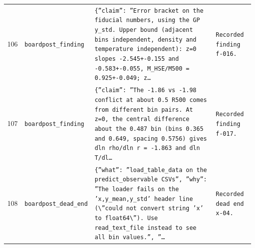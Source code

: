 \documentclass[11pt,a4paper]{article}
\begin{document}
\begin{longtable}{@{}p{}p{}p{}p{}@{}}
106 & \texttt{board}\newline\texttt{post\_\allowbreak{}finding} & \texttt{\{''claim'':\allowbreak{} ''Error bracket on the fiducial numbers,\allowbreak{} using the GP y\_\allowbreak{}std. Upper bound (adjacent bins independent,\allowbreak{} density and temperature independent)\allowbreak{}:\allowbreak{} z=\allowbreak{}0 slopes -2.545+-0.155 and -0.583+-0.055,\allowbreak{} M\_\allowbreak{}HSE/\allowbreak{}M500 =\allowbreak{} 0.925+-0.049;\allowbreak{} z\ldots{}\allowbreak{}} & \texttt{Recorded finding f-016.} \\
107 & \texttt{board}\newline\texttt{post\_\allowbreak{}finding} & \texttt{\{''claim'':\allowbreak{} ''The -1.86 vs -1.98 conflict at about 0.5 R500 comes from different bin pairs. At z=\allowbreak{}0,\allowbreak{} the central difference about the 0.487 bin (bins 0.365 and 0.649,\allowbreak{} spacing 0.5756)\allowbreak{} gives dln rho/\allowbreak{}dln r =\allowbreak{} -1.863 and dln T/\allowbreak{}dl\ldots{}\allowbreak{}} & \texttt{Recorded finding f-017.} \\
108 & \texttt{board}\newline\texttt{post\_\allowbreak{}dead\_\allowbreak{}end} & \texttt{\{''what'':\allowbreak{} ''load\_\allowbreak{}table\_\allowbreak{}data on the predict\_\allowbreak{}observable CSVs'',\allowbreak{} ''why'':\allowbreak{} ''The loader fails on the 'x,\allowbreak{}y\_\allowbreak{}mean,\allowbreak{}y\_\allowbreak{}std' header line (\textbackslash{}\allowbreak{}''could not convert string 'x' to float64\textbackslash{}\allowbreak{}'')\allowbreak{}. Use read\_\allowbreak{}text\_\allowbreak{}file instead to see all bin values.'',\allowbreak{} ''\ldots{}\allowbreak{}} & \texttt{Recorded dead end x-04.} \\
\bottomrule\end{longtable}
\end{document}
